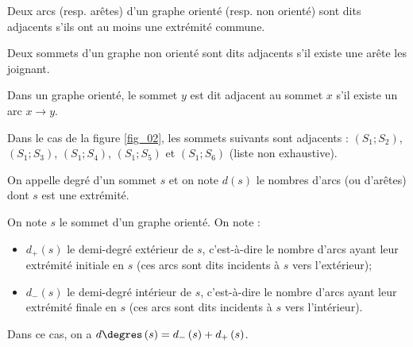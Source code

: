 \begin{defi}[Adjacence]
Deux arcs (resp. arêtes) d'un graphe orienté (resp. non orienté) sont dits adjacents s'ils ont au moins une extrémité commune. 

Deux sommets d'un graphe non orienté sont dits adjacents s'il existe une arête les joignant. 

Dans un graphe orienté, le sommet $y$ est dit adjacent au sommet $x$ s'il existe un arc $x\to y$.
\end{defi}

 \begin{exemple}
 Dans le cas de la figure \autoref{fig_02}, les sommets suivants sont adjacents : $\left(S_1;S_2 \right)$, $\left(S_1;S_3 \right)$, $\left(S_1;S_4 \right)$, $\left(S_1;S_5 \right)$ et $\left(S_1;S_6 \right)$ (liste non exhaustive). 

 \end{exemple}

%
%
%
%
%
%
%

\begin{defi}[Boucle]

\end{defi}


\begin{defi}
On appelle degré d'un sommet $s$ et on note $d\left(s\right)$ le nombres d'arcs (ou d'arêtes) dont $s$ est une extrémité.
\end{defi}

\begin{defi}
On note $s$ le sommet d'un graphe orienté. On note : 
\begin{itemize}
\item $d_{+}\left(s\right)$ le demi-degré extérieur de $s$, c'est-à-dire le nombre d'arcs ayant leur extrémité initiale en $s$ (ces arcs sont dits incidents à $s$ vers l'extérieur);
\item $d_{-}\left(s\right)$ le demi-degré intérieur de $s$, c'est-à-dire le nombre d'arcs ayant leur extrémité finale en $s$ (ces arcs sont dits incidents à $s$ vers l'intérieur).
\end{itemize}

Dans ce cas, on a  $d\degres\left(s\right)=d_{-}\left(s\right)+d_{+}\left(s\right)$.
\end{defi}


